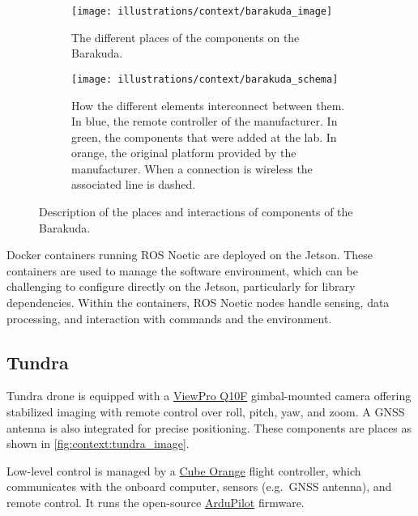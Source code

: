 \begin{figure}[ht!]
    \centering
    \begin{subfigure}{.35\textwidth}
        \centering
        \texttt{[image: illustrations/context/barakuda\_image]}
        \caption{The different places of the components on the Barakuda.}
        \label{fig:context:barakuda_image}
    \end{subfigure}%
    \hfill%
    \begin{subfigure}{.63\textwidth}
        \centering
        \texttt{[image: illustrations/context/barakuda\_schema]}
        \caption{How the different elements interconnect between them.
        In blue, the remote controller of the manufacturer.
        In green, the components that were added at the lab.
        In orange, the original platform provided by the manufacturer.
        When a connection is wireless the associated line is dashed.}
        \label{fig:context:barakuda_schematics}
    \end{subfigure}
    \caption{Description of the places and interactions of components of the Barakuda.}
    \label{fig:context:barakuda}
\end{figure}

Docker containers running ROS Noetic are deployed on the Jetson.
These containers are used to manage the software environment, which can be challenging to configure directly on the Jetson, particularly for library dependencies.
Within the containers, ROS Noetic nodes handle sensing, data processing, and interaction with commands and the environment.

\subsection{Tundra}\label{subsec:tundra}

Tundra drone is equipped with a \href{https://www.viewprotech.com/index.php?ac=article&at=read&did=279}{ViewPro Q10F} gimbal-mounted camera
offering stabilized imaging with remote control over roll, pitch, yaw, and zoom.
A GNSS antenna is also integrated for precise positioning.
These components are places as shown in \cref{fig:context:tundra_image}.

Low-level control is managed by a \href{https://www.cubepilot.com/#/cube/features}{Cube Orange} flight controller,
which communicates with the onboard computer, sensors (e.g.\ GNSS antenna), and remote control.
It runs the open-source \href{https://github.com/ArduPilot/ardupilot}{ArduPilot} firmware.

